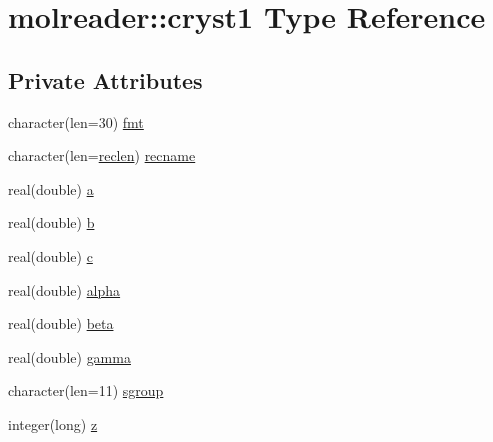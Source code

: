 \hypertarget{structmolreader_1_1cryst1}{\section{molreader\+:\+:cryst1 Type Reference}
\label{structmolreader_1_1cryst1}
}
\subsection*{Private Attributes}
\begin{DoxyCompactItemize}
\item 
character(len=30) \hyperlink{structmolreader_1_1cryst1_ab6ab864b10676c184026f298e2298135}{fmt}
\item 
character(len=\hyperlink{classmolreader_a8f12be3272b946fd698c9fbaf2ba9d32}{reclen}) \hyperlink{structmolreader_1_1cryst1_ae85e046760ae97562351b100fd2c9034}{recname}
\item 
real(double) \hyperlink{structmolreader_1_1cryst1_a85327bed083d1034112fc1bc78efd7e0}{a}
\item 
real(double) \hyperlink{structmolreader_1_1cryst1_a0cedac0856256f960f563ea0e3d57945}{b}
\item 
real(double) \hyperlink{structmolreader_1_1cryst1_a6269ff5021092d6d0b0185cda1572489}{c}
\item 
real(double) \hyperlink{structmolreader_1_1cryst1_a6186be5cb316849fcb7cfca0ec9c6358}{alpha}
\item 
real(double) \hyperlink{structmolreader_1_1cryst1_a0c69e8f33d0711ee345d6bfc3212e671}{beta}
\item 
real(double) \hyperlink{structmolreader_1_1cryst1_a5830f0c34f6ad1c07482a203f7a7b175}{gamma}
\item 
character(len=11) \hyperlink{structmolreader_1_1cryst1_a689985667a15167b26dee5b87a240333}{sgroup}
\item 
integer(long) \hyperlink{structmolreader_1_1cryst1_ae973dda59fd038efc49c8a247e3e71c9}{z}
\end{DoxyCompactItemize}


